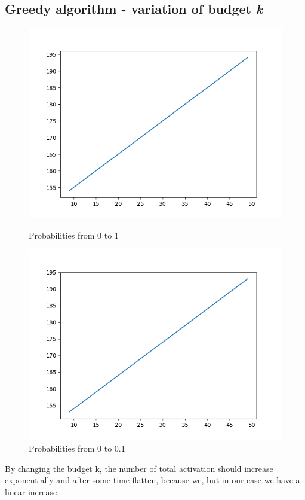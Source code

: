 \subsection{Greedy algorithm - variation of budget \textit{k}}
\begin{figure}[H]
    \includegraphics[width=\linewidth]{Report/figs/Greedy-0to1.png}
    \caption{Probabilities from 0 to 1}\label{fig:greedy01}
\endminipage\hfill
{}
    \includegraphics[width=\linewidth]{Report/figs/Greedy-0to01.png}
    \caption{Probabilities from 0 to 0.1}\label{fig:greedy001}
\endminipage
\end{figure}
By changing the budget k, the number of total activation should increase exponentially and after some time flatten, because we, but in our case we have a linear increase.
